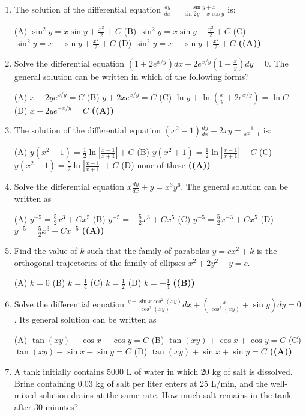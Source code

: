 \documentclass{article}
\begin{document}
\begin{enumerate}
(A) $\frac{1}{2(x^2+y^2)} = \frac{y}{x} + C$
(B) $\frac{1}{2(x^2+y^2)} = \frac{y}{x} + C$
(C) $\frac{1}{x^2+y^2} = \frac{y}{x} + C$
(D) $\frac{1}{2(x^2+y^2)} = -\frac{y}{x} + C$ \hfill \textbf{((A))}
\item The solution of the differential equation $\frac{dy}{dx} = \frac{\sin y + x}{\sin 2y - x \cos y}$ is:

(A) $\sin^2 y = x \sin y + \frac{x^2}{2} + C$
(B) $\sin^2 y = x \sin y - \frac{x^2}{2} + C$
(C) $\sin^2 y = x + \sin y + \frac{x^2}{2} + C$
(D) $\sin^2 y = x - \sin y + \frac{x^2}{2} + C$ \hfill \textbf{((A))}
\item Solve the differential equation $(1+ 2e^{x/y}) dx + 2e^{x/y} (1-\frac{x}{y}) dy = 0$.
The general solution can be written in which of the following forms?

(A) $x + 2y e^{x/y} = C$
(B) $y + 2x e^{x/y} = C$
(C) $\ln y + \ln(\frac{x}{y} + 2e^{x/y}) = \ln C$
(D) $x + 2y e^{-x/y} = C$ \hfill \textbf{((A))}
\item The solution of the differential equation $(x^2 - 1) \frac{dy}{dx} + 2xy = \frac{1}{x^2-1}$ is:

(A) $y (x^2 - 1) = \frac{1}{2} \ln|\frac{x-1}{x+1}| + C$
(B) $y (x^2 + 1) = \frac{1}{2} \ln|\frac{x-1}{x+1}| - C$
(C) $y (x^2 - 1) = \frac{5}{2} \ln|\frac{x-1}{x+1}| + C$
(D) none of these \hfill \textbf{((A))}
\item Solve the differential equation $x \frac{dy}{dx} + y = x^3 y^6$.
The general solution can be written as

(A) $y^{-5} = \frac{5}{2} x^3 + C x^5$
(B) $y^{-5} = - \frac{5}{2} x^3 + C x^5$
(C) $y^{-5} = \frac{5}{2} x^{-3} + C x^5$
(D) $y^{-5} = \frac{5}{2} x^3 + C x^{-5}$ \hfill \textbf{((A))}
\item Find the value of $k$ such that the family of parabolas $y = cx^2 + k$ is the orthogonal trajectories of the family of ellipses $x^2 + 2y^2 - y = c$.

(A) $k = 0$
(B) $k = \frac{1}{4}$
(C) $k = \frac{1}{2}$
(D) $k = -\frac{1}{4}$ \hfill \textbf{((B))}
\item Solve the differential equation $\frac{y+\sin x \cos^2(xy)}{\cos^2(xy)} dx + (\frac{x}{\cos^2(xy)} + \sin y) dy = 0$.
Its general solution can be written as

(A) $\tan(xy) - \cos x - \cos y = C$
(B) $\tan(xy) + \cos x + \cos y = C$
(C) $\tan(xy) - \sin x - \sin y = C$
(D) $\tan(xy) + \sin x + \sin y = C$ \hfill \textbf{((A))}
\item A tank initially contains 5000 L of water in which 20 kg of salt is dissolved. Brine containing 0.03 kg of salt per liter enters at 25 L/min, and the well-mixed solution drains at the same rate. How much salt remains in the tank after 30 minutes?


\end{enumerate}
\end{document}
